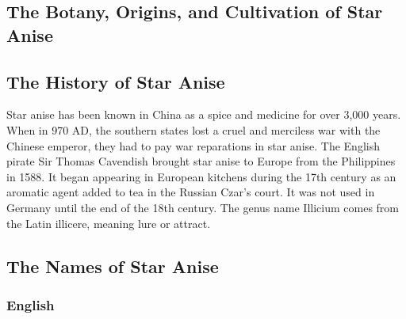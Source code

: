 


\subsection{The Botany, Origins, and Cultivation of Star Anise}

\subsection{The History of Star Anise}

Star anise has been known in China as a spice and medicine for over 3,000 years. When in 970 AD, the southern states lost a cruel and merciless war with the Chinese emperor, they had to pay war reparations in star anise. The English pirate Sir Thomas Cavendish brought star anise to Europe from the Philippines in 1588. It began appearing in European kitchens during the 17th century as an aromatic agent added to tea in the Russian Czar's court. It was not used in Germany until the end of the 18th century. The genus name Illicium comes from the Latin illicere, meaning lure or attract.


\subsection{The Names of Star Anise}

\subsubsection{English}


